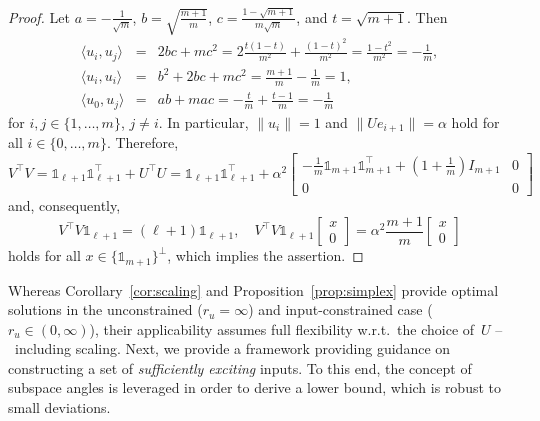 \documentclass[a4paper, reqno]{amsart}
\newcommand{\dd}{\ell}
\newcommand{\one}{\mathds{1}}
\begin{document}
\begin{proof}
    Let $a = -\frac{1}{\sqrt{m}}$, $b = \sqrt{\frac{m+1}{m}}$, $c = \frac{1-\sqrt{m+1}}{m\sqrt{m}}$, and $t = \sqrt{m+1}$. Then 
    \begin{eqnarray*}
        \langle u_i, u_j \rangle & = & 2bc + mc^2 = 2\frac{t(1-t)}{m^2} + \frac{(1-t)^2}{m^2} = \frac{1-t^2}{m^2} = -\frac{1}{m}, \\
        \langle u_i, u_i \rangle & = & b^2 + 2bc + mc^2 = \frac{m+1}{m} - \frac{1}{m} = 1, \\
        \langle u_0, u_j \rangle & = & ab + mac = - \frac{t}{m} + \frac{t-1}{m} = -\frac{1}{m}
    \end{eqnarray*}
    for $i,j\in\lbrace 1,\dots, m\rbrace$, $j\neq i$.
    In particular, $\lVert u_i \rVert = 1$ and $\lVert U e_{i+1} \rVert = \alpha$ hold for all $i\in\lbrace 0,\dots,m \rbrace$. Therefore,
    \begin{equation}\nonumber
        V^\top V = \one_{\dd+1} \one_{\dd+1}^\top + U^\top U = \one_{\dd+1} \one_{\dd+1}^\top 
        + \alpha^2\begin{bmatrix}
            -\frac{1}{m} \one_{m+1}\one_{m+1}^\top + (1+\frac{1}{m}) I_{m+1} & 0\\ 0 & 0
        \end{bmatrix}
    \end{equation}
    and, consequently, 
    \begin{equation}\nonumber
        V^\top V \one_{\dd+1} = (\dd+1)\one_{\dd+1},\quad V^\top V \one_{\dd+1}\begin{bmatrix}
            x\\ 0
        \end{bmatrix} = \alpha^2\frac{m+1}{m}\begin{bmatrix}
            x\\ 0
        \end{bmatrix}
    \end{equation}
    holds for all $x\in \{\one_{m+1}\}^\bot$, which implies the assertion.
\end{proof}
Whereas Corollary~\ref{cor:scaling} and Proposition~\ref{prop:simplex} provide optimal solutions in the unconstrained ($r_u = \infty$) and input-constrained case ($r_u \in (0,\infty)$), their applicability assumes full flexibility w.r.t.\ the choice of~$U$ --~including scaling. 
Next, we provide a framework providing guidance on constructing a set of \textit{sufficiently exciting} inputs. 
To this end, the concept of subspace angles is leveraged in order to derive a lower bound, which is robust to small deviations. 
\end{document}
